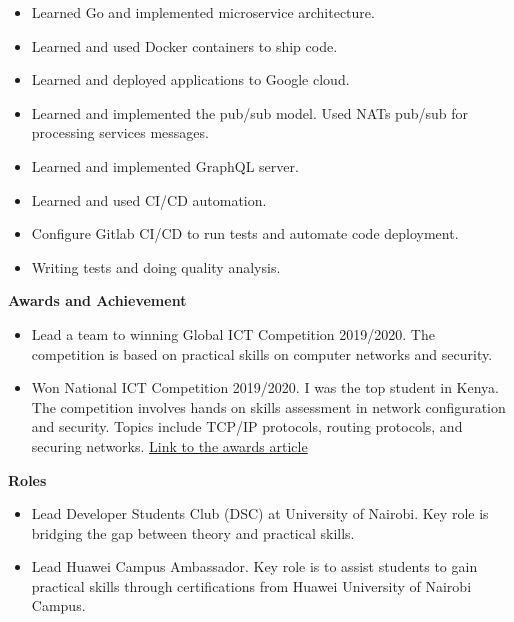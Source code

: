 \documentclass[a4paper]{article}
\begin{document}
\begin{itemize}[noitemsep]
    \item Learned Go and implemented microservice architecture.
    \item Learned and used Docker containers to ship code.
    \item Learned and deployed applications to Google cloud.
    \item Learned and implemented the pub/sub model. Used NATs pub/sub for processing services messages.
    \item Learned and implemented GraphQL server.
    \item Learned and used CI/CD automation.
    \item Configure Gitlab CI/CD to run tests and automate code deployment.
    \item Writing tests and doing quality analysis.
\end{itemize}

\begin{center}
    {\Large \textbf{Awards and Achievement}}
\end{center}

\begin{itemize}[noitemsep]
    \item Lead a team to winning Global ICT Competition 2019/2020. The competition is based on practical skills on computer networks and security.
    \item Won National ICT Competition 2019/2020. I was the top student in Kenya. The competition involves hands on skills assessment in network configuration and security. Topics include TCP/IP protocols, routing protocols, and securing networks. \href{https://www.uonbi.ac.ke/news/uon-student-wins-huawei-network-cloud-track-award}{Link to the awards article}
\end{itemize}

\begin{center}
    {\Large \textbf{Roles}}
\end{center}

\begin{itemize}[noitemsep]
    \item Lead Developer Students Club (DSC) at University of Nairobi. Key role is bridging the gap between theory and practical skills.
    \item Lead Huawei Campus Ambassador. Key role is to assist students to gain practical skills through certifications from Huawei University of Nairobi Campus.
\end{itemize}
\end{document}
